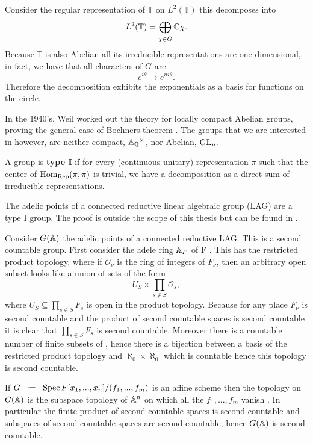 \begin{example}
	Consider the regular representation of \(\mathbb{T}\) on \(L^2(\mathbb{T})\) this decomposes into 
	\[L^2(\mathbb{T}) = \bigoplus_{\chi\in \hat{G}}  \C \chi .\]
	Because \(\mathbb{T}\) is also Abelian all its irreducible representations are one dimensional, in fact, we have that all characters of \(G\) are 
	\[e^{i\theta} \mapsto e^{ni\theta}.\]
	Therefore the decomposition exhibits the exponentials as a basis for functions on the circle.
\end{example}

In the 1940's, Weil worked out the theory for locally compact Abelian groups, proving the general case of Bochners theorem \cite[Thm. 4.18]{follandCourseAbstractHarmonic2016a}. The groups that we are interested in however, are neither compact,  \(\A_\Q^\times\), nor Abelian, \(\operatorname{GL}_n\).

A group is \textbf{type I} if for every (continuous unitary) representation \(\pi\) such that the center of \(\operatorname{Hom}_\mathrm{Rep}(\pi, \pi)\) is trivial, we have a decomposition as a  direct sum of irreducible representations. 

\begin{example}
	The adelic points of a connected reductive linear algebraic group (LAG) are a type I group. The proof is outside the scope of this thesis but can be found in \cite[Thm. 1.7 + Thm. 2.3]{deitmarTraceClassGroups2017}.
\end{example}

\begin{example}
	Consider \(G(\A)\) the adelic points of a connected reductive LAG. This is a second countable group. First consider the adele ring \(\A_F\) of F . This has the restricted product topology, where if \(\mathcal{O}_\nu\) is the ring of integers of \(F_\nu\), then an arbitrary open subset looks like a union of sets of the form 
	\[U_S \times \prod_{s\notin S} \mathcal{O}_s,\]
	where \(U_S\subseteq \prod_{s\in S}F_s\) is open in the product topology. 
	Because for any place \(F_\nu\) is second countable and the product of second countable spaces is second countable it is clear that \(\prod_{s\in S} F_s\) is second countable. Moreover there is a countable number of finite subsets of \Z, hence there is a bijection between a basis of the restricted product topology and \(\aleph_0\times \aleph_0 \) which is countable hence this topology is second countable.
	
	If \(G \defeq \Spec F[x_1, ..., x_n]/(f_1, ..., f_m)\) is an affine scheme then the topology on \(G(\A)\) is the subspace topology of \(\A^n\) on which all the \(f_1, ..., f_m\) vanish \cite{conradWeilGrothendieckApproaches2012}. In particular the finite product of second countable spaces is second countable and subspaces of second countable spaces are second countable, hence \(G(\A)\) is second countable. 
\end{example}

